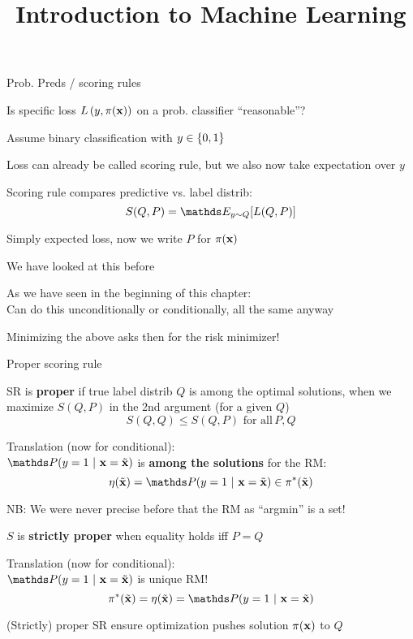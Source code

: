 \documentclass[11pt,compress,t,notes=noshow, xcolor=table]{beamer}
\title{Introduction to Machine Learning}
\begin{document}
    

\begin{framei}[sep=M]{Prob. Preds / scoring rules }

\item Is specific loss $L\left(y, \pi(\mathbf{x})\right)$ on a prob. classifier ``reasonable''?
\item Assume binary classification with $y \in \{0, 1\}$
\item Loss can already be called scoring rule, but we also now take expectation over $y$
\item Scoring rule compares predictive vs. label distrib: 
$$ S(Q, P) = \E_{y \sim Q}[L(Q, P)]$$
\item Simply expected loss, now we write $P$ for $\pi(\mathbf{x})$
\item We have looked at this before
\item As we have seen in the beginning of this chapter:\\ 
Can do this unconditionally or conditionally, all the same anyway
\item Minimizing the above asks then for the risk minimizer!


\end{framei}

\begin{framei}[sep=M]{Proper scoring rule }

\item SR is \textbf{proper} if true label distrib $Q$ is among the optimal 
solutions, when we maximize $S(Q, P)$ in the 2nd argument (for a given $Q$)
$$S(Q,Q) \leq S(Q, P) \,\, \text{for all} \, P,Q $$

\item Translation (now for conditional): \\
$\P(y = 1 ~|~ \xv = \xtil)$ is \textbf{among the solutions} for the RM: 
$$
   \eta(\xtil) = \P(y = 1 ~|~ \xv = \xtil) \in \piastxtil
$$

\item NB: We were never precise before that the RM as ``argmin'' is a set!

\item $S$ is \textbf{strictly proper} when equality holds iff $P=Q$

\item Translation (now for conditional): \\
$\P(y = 1 ~|~ \xv = \xtil)$ is unique RM! 
$$
   \piastxtil = \eta(\xtil) = \P(y = 1 ~|~ \xv = \xtil)
$$

\item (Strictly) proper SR ensure optimization pushes solution $\pi(\mathbf{x})$ to $Q$ 


\end{framei}
\end{document}
